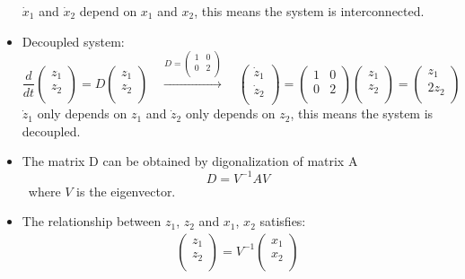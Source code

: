 \begin{ex}{}
\begin{itemize}
$\dot{x}_{1}$ and $\dot{x}_{2}$ depend on $x_{1}$ and $x_{2}$, this means the system is interconnected. 
\item Decoupled system:
\begin{equation*}
\frac{d}{dt} 
\begin{pmatrix}
z_{1}\\
z_{2}\\
\end{pmatrix}
=D
\begin{pmatrix}
z_{1}\\
z_{2}\\
\end{pmatrix} \quad \xrightarrow{D=\begin{pmatrix}
1 & 0\\
0 & 2\\
\end{pmatrix}} \quad 
\begin{pmatrix}
\dot{z}_{1}\\
\dot{z}_{2}\\
\end{pmatrix} = 
\begin{pmatrix}
1 & 0\\
0 & 2\\
\end{pmatrix}
\begin{pmatrix}
z_{1}\\
z_{2}\\
\end{pmatrix} = \begin{pmatrix}
z_{1}\\
2z_{2}\\
\end{pmatrix}
\end{equation*}
$\dot{z}_{1}$ only depends on $z_{1}$ and $\dot{z}_{2}$ only depends on $z_{2}$, this means the system is decoupled. 
\item The matrix D can be obtained by digonalization of matrix A
\[D =  V^{-1}AV\]
 \ where $V$ is the eigenvector.
\item The relationship between $z_{1}$, $z_{2}$ and $x_{1}$, $x_{2}$ satisfies:
\begin{gather*}
\begin{pmatrix}
z_{1}\\
z_{2}\\
\end{pmatrix}
=V^{-1}
\begin{pmatrix}
x_{1}\\
x_{2}\\

\end{pmatrix}
\end{gather*}
\end{itemize}
\end{ex}
